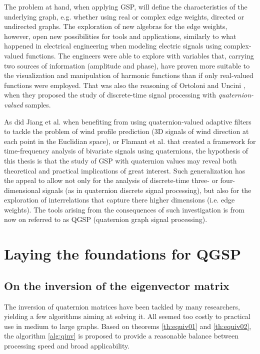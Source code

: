 The problem at hand, when applying GSP, will define the characteristics of the underlying graph, e.g. whether using real or complex edge weights, directed or undirected graphs. The exploration of new algebras for the edge weights, however, open new possibilities for tools and applications, similarly to what happened in electrical engineering when modeling electric signals using complex-valued functions. The engineers were able to explore with variables that, carrying two sources of information (amplitude and phase), have proven more suitable to the visualization and manipulation of harmonic functions than if only real-valued functions were employed. That was also the reasoning of Ortoloni and Uncini \cite{ortolani2016quaternion}, when they proposed the study of discrete-time signal processing with \emph{quaternion-valued} samples.

As did Jiang et al. \cite{jiang2013frequency} when benefiting from using quaternion-valued adaptive filters to tackle the problem of wind profile prediction (3D signals of wind direction at each point in the Euclidian space), or Flamant et al. \cite{flamant2018complete} that created a framework for time-frequency analysis of bivariate signals using quaternions, the hypothesis of this thesis is that the study of GSP with quaternion values may reveal both theoretical and practical implications of great interest. Such generalization has the appeal to allow not only for the analysis of discrete-time three- or four-dimensional signals (as in quaternion discrete signal processing), but also for the exploration of interrelations that capture there higher dimensions (i.e. edge weights). The tools arising from the consequences of such investigation is from now on referred to as QGSP (quaternion graph signal processing).

\section{Laying the foundations for QGSP}

\subsection{On the inversion of the eigenvector matrix}

The inversion of quaternion matrices have been tackled by many researchers, yielding a few algorithms aiming at solving it.  All seemed too costly to practical use in medium to large graphs. Based on theorems \ref{th:equiv01} and \ref{th:equiv02},
the algorithm \ref{alg:qinv} is proposed to provide a reasonable balance between processing speed and broad applicability.

